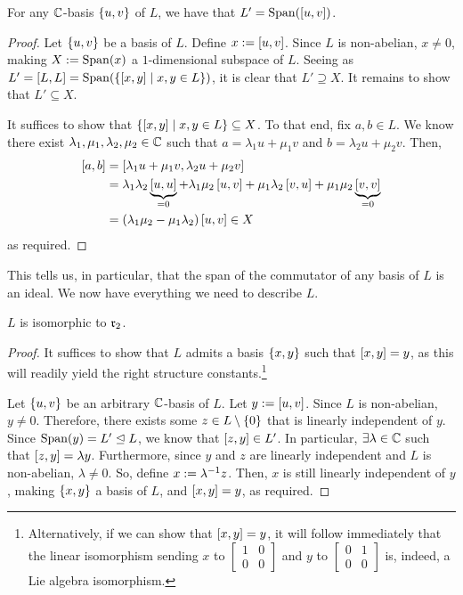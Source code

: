 \begin{lemma}
    For any $\mathbb{C}$-basis $\left\{ u, v \right\}$ of $L$, we have that $L' = \operatorname{Span}\!\left( \left[ u, v \right] \right)$.
\end{lemma}
\begin{proof}
    Let $\left\{ u, v \right\}$ be a basis of $L$. Define $x := \left[ u, v \right]$. Since $L$ is non-abelian, $x \neq 0$, making $X := \operatorname{Span}\!\left( x \right)$ a $1$-dimensional subspace of $L$. Seeing as $L' = \left[ L, L \right] = \operatorname{Span}\!\left( \left\{ \left[ x, y \right] \; \middle\vert \; x, y \in L \right\} \right)$, it is clear that $L' \supseteq X$. It remains to show that $L' \subseteq X$.

    It suffices to show that $\left\{ \left[ x, y \right] \; \middle\vert \; x, y \in L \right\} \subseteq X$. To that end, fix $a, b \in L$. We know there exist $\lambda_1, \mu_1, \lambda_2, \mu_2 \in \mathbb{C}$ such that $a = \lambda_1 u + \mu_1 v$ and $b = \lambda_2 u + \mu_2 v$. Then,
    \begin{align*}
        \left[ a, b \right]
        &= \left[ \lambda_1 u + \mu_1 v, \lambda_2 u + \mu_2 v \right] \\
        &= \lambda_1 \lambda_2 \underbrace{\left[ u, u \right]}_{= 0} + \lambda_1 \mu_2 \left[ u, v \right] + \mu_1 \lambda_2 \left[ v, u \right] + \mu_1 \mu_2 \underbrace{\left[ v, v \right]}_{= 0} \\
        &= \left( \lambda_1 \mu_2 - \mu_1 \lambda_2 \right) \left[ u, v \right] \in X
    \end{align*}
    as required.
\end{proof}

This tells us, in particular, that the span of the commutator of any basis of $L$ is an ideal. We now have everything we need to describe $L$.

\begin{boxproposition}
    $L$ is isomorphic to $\mathfrak{r}_2$.
\end{boxproposition}
\begin{proof}
    It suffices to show that $L$ admits a basis $\left\{ x, y \right\}$ such that $\left[ x, y \right] = y$, as this will readily yield the right structure constants.\footnote{Alternatively, if we can show that $\left[ x, y \right] = y$, it will follow immediately that the linear isomorphism sending $x$ to $\begin{bmatrix} 1 & 0 \\ 0 & 0 \end{bmatrix}$ and $y$ to $\begin{bmatrix} 0 & 1 \\ 0 & 0 \end{bmatrix}$ is, indeed, a Lie algebra isomorphism.}
    
    Let $\left\{ u, v \right\}$ be an arbitrary $\mathbb{C}$-basis of $L$. Let $y := \left[ u, v \right]$. Since $L$ is non-abelian, $y \neq 0$. Therefore, there exists some $z \in L \setminus \left\{ 0 \right\}$ that is linearly independent of $y$. Since $\operatorname{Span}\!\left( y \right) = L' \trianglelefteq L$, we know that $\left[ z, y \right] \in L'$. In particular, $\exists \lambda \in \mathbb{C}$ such that $\left[ z, y \right] = \lambda y$. Furthermore, since $y$ and $z$ are linearly independent and $L$ is non-abelian, $\lambda \neq 0$. So, define $x := \lambda^{-1} z$. Then, $x$ is still linearly independent of $y$, making $\left\{ x, y \right\}$ a basis of $L$, and $\left[ x, y \right] = y$, as required.
\end{proof}

